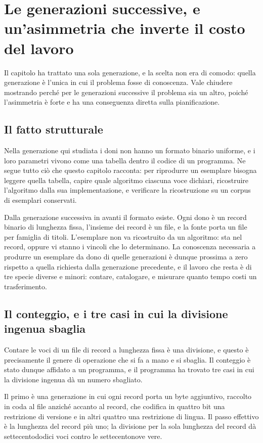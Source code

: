 \section{Le generazioni successive, e un'asimmetria che inverte il costo del lavoro}

Il capitolo ha trattato una sola generazione, e la scelta non era di comodo: quella generazione è l'unica in cui il problema fosse di conoscenza. Vale chiudere mostrando perché per le generazioni successive il problema sia un altro, poiché l'asimmetria è forte e ha una conseguenza diretta sulla pianificazione.

\subsection*{Il fatto strutturale}

Nella generazione qui studiata i doni non hanno un formato binario uniforme, e i loro parametri vivono come una tabella dentro il codice di un programma. Ne segue tutto ciò che questo capitolo racconta: per riprodurre un esemplare bisogna leggere quella tabella, capire quale algoritmo ciascuna voce dichiari, ricostruire l'algoritmo dalla sua implementazione, e verificare la ricostruzione su un corpus di esemplari conservati.

Dalla generazione successiva in avanti il formato esiste. Ogni dono è un record binario di lunghezza fissa, l'insieme dei record è un file, e la fonte porta un file per famiglia di titoli. L'esemplare non va ricostruito da un algoritmo: sta nel record, oppure vi stanno i vincoli che lo determinano. La conoscenza necessaria a produrre un esemplare da dono di quelle generazioni è dunque prossima a zero rispetto a quella richiesta dalla generazione precedente, e il lavoro che resta è di tre specie diverse e minori: contare, catalogare, e misurare quanto tempo costi un trasferimento.

\subsection*{Il conteggio, e i tre casi in cui la divisione ingenua sbaglia}

Contare le voci di un file di record a lunghezza fissa è una divisione, e questo è precisamente il genere di operazione che si fa a mano e si sbaglia. Il conteggio è stato dunque affidato a un programma, e il programma ha trovato tre casi in cui la divisione ingenua dà un numero sbagliato.

Il primo è una generazione in cui ogni record porta un byte aggiuntivo, raccolto in coda al file anziché accanto al record, che codifica in quattro bit una restrizione di versione e in altri quattro una restrizione di lingua. Il passo effettivo è la lunghezza del record più uno; la divisione per la sola lunghezza del record dà settecentododici voci contro le settecentonove vere.

